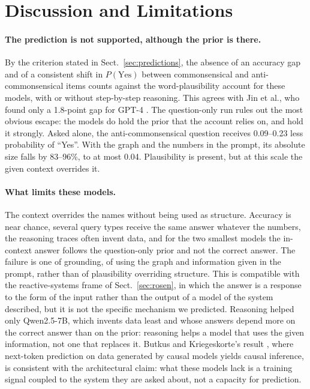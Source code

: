 \documentclass{llncs}
\begin{document}
\section{Discussion and Limitations}
\label{sec:discussion}

\paragraph{The prediction is not supported, although the prior is there.} By the criterion stated in Sect.~\ref{sec:predictions}, the absence of an accuracy gap and of a consistent shift in $P(\text{Yes})$ between commonsensical and anti-commonsensical items counts against the word-plausibility account for these models, with or without step-by-step reasoning. This agrees with Jin et al., who found only a 1.8-point gap for GPT-4 \cite{jin2023cladder}. The question-only run rules out the most obvious escape: the models do hold the prior that the account relies on, and hold it strongly. Asked alone, the anti-commonsensical question receives 0.09--0.23 less probability of ``Yes''. With the graph and the numbers in the prompt, its absolute size falls by 83--96\%, to at most 0.04. Plausibility is present, but at this scale the given context overrides it.

\paragraph{What limits these models.} The context overrides the names without being used as structure. Accuracy is near chance, several query types receive the same answer whatever the numbers, the reasoning traces often invent data, and for the two smallest models the in-context answer follows the question-only prior and not the correct answer. The failure is one of grounding, of using the graph and information given in the prompt, rather than of plausibility overriding structure. This is compatible with the reactive-systems frame of Sect.~\ref{sec:rosen}, in which the answer is a response to the form of the input rather than the output of a model of the system described, but it is not the specific mechanism we predicted. Reasoning helped only Qwen2.5-7B, which invents data least and whose answers depend more on the correct answer than on the prior: reasoning helps a model that uses the given information, not one that replaces it. Butkus and Kriegeskorte's result \cite{butkus2025causal}, where next-token prediction on data generated by causal models yields causal inference, is consistent with the architectural claim: what these models lack is a training signal coupled to the system they are asked about, not a capacity for prediction.
\end{document}
